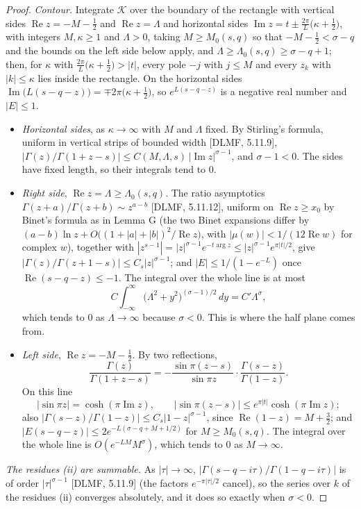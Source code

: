 \documentclass[11pt]{article}
\newcommand{\re}{\operatorname{Re}}
\newcommand{\im}{\operatorname{Im}}
\begin{document}
\begin{proof}
\emph{Contour.} Integrate $\mathcal{K}$ over the boundary of the rectangle with vertical sides $\re z=-M-\frac12$ and $\re z=\Lambda$ and horizontal sides $\im z=t\pm\frac{2\pi}{L}\bigl(\kappa+\frac12\bigr)$, with integers $M,\kappa\ge1$ and $\Lambda>0$, taking $M\ge M_0(s,q)$ so that $-M-\frac12<\sigma-q$ and the bounds on the left side below apply, and $\Lambda\ge\Lambda_0(s,q)\ge\sigma-q+1$; then, for $\kappa$ with $\frac{2\pi}{L}\bigl(\kappa+\frac12\bigr)>|t|$, every pole $-j$ with $j\le M$ and every $z_k$ with $|k|\le\kappa$ lies inside the rectangle. On the horizontal sides $\im\bigl(L(s-q-z)\bigr)=\mp2\pi\bigl(\kappa+\frac12\bigr)$, so $e^{L(s-q-z)}$ is a negative real number and $|E|\le1$.
\begin{itemize}
\item \emph{Horizontal sides}, as $\kappa\to\infty$ with $M$ and $\Lambda$ fixed. By Stirling's formula, uniform in vertical strips of bounded width [DLMF, 5.11.9], $|\Gamma(z)/\Gamma(1+z-s)|\le C(M,\Lambda,s)\,|\im z|^{\sigma-1}$, and $\sigma-1<0$. The sides have fixed length, so their integrals tend to $0$.
\item \emph{Right side}, $\re z=\Lambda\ge\Lambda_0(s,q)$. The ratio asymptotics $\Gamma(z+a)/\Gamma(z+b)\sim z^{a-b}$ [DLMF, 5.11.12], uniform on $\re z\ge x_0$ by Binet's formula as in Lemma G (the two Binet expansions differ by $(a-b)\ln z+O\bigl((1+|a|+|b|)^2/\re z\bigr)$, with $|\mu(w)|<1/(12\re w)$ for complex $w$), together with $|z^{s-1}|=|z|^{\sigma-1}e^{-t\arg z}\le|z|^{\sigma-1}e^{\pi|t|/2}$, give $|\Gamma(z)/\Gamma(z+1-s)|\le C_s|z|^{\sigma-1}$; and $|E|\le1/(1-e^{-L})$ once $\re(s-q-z)\le-1$. The integral over the whole line is at most
\[
C\int_{-\infty}^{\infty}\bigl(\Lambda^2+y^2\bigr)^{(\sigma-1)/2}\,dy=C'\Lambda^{\sigma},
\]
which tends to $0$ as $\Lambda\to\infty$ because $\sigma<0$. This is where the half plane comes from.
\item \emph{Left side}, $\re z=-M-\frac12$. By two reflections,
\[
\frac{\Gamma(z)}{\Gamma(1+z-s)}=-\frac{\sin\pi(z-s)}{\sin\pi z}\cdot\frac{\Gamma(s-z)}{\Gamma(1-z)}.
\]
On this line
\[
|\sin\pi z|=\cosh(\pi\im z),\qquad|\sin\pi(z-s)|\le e^{\pi|t|}\cosh(\pi\im z);
\]
also $|\Gamma(s-z)/\Gamma(1-z)|\le C_s|1-z|^{\sigma-1}$, since $\re(1-z)=M+\frac32$; and $|E(s-q-z)|\le2e^{-L(\sigma-q+M+1/2)}$ for $M\ge M_0(s,q)$. The integral over the whole line is $O(e^{-LM}M^{\sigma})$, which tends to $0$ as $M\to\infty$.
\end{itemize}

\emph{The residues (ii) are summable.} As $|\tau|\to\infty$, $|\Gamma(s-q-i\tau)/\Gamma(1-q-i\tau)|$ is of order $|\tau|^{\sigma-1}$ [DLMF, 5.11.9] (the factors $e^{-\pi|\tau|/2}$ cancel), so the series over $k$ of the residues (ii) converges absolutely, and it does so exactly when $\sigma<0$.


\end{proof}
\end{document}
